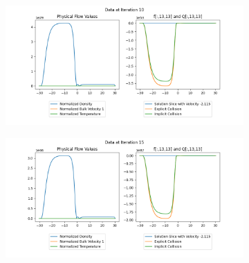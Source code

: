 \documentclass{article}
\begin{document}
\begin{figure}[H]
  
  \begin{subfigure}[b]{\textwidth}
  \includegraphics[width=\textwidth]{imgs/lax_friedrichs/output_implicit/10.png}
  \end{subfigure}
  \hfill
  \begin{subfigure}[b]{\textwidth}
  \includegraphics[width=\textwidth]{imgs/lax_friedrichs/output_implicit/15.png}
  \end{subfigure}
\end{figure}
\end{document}
